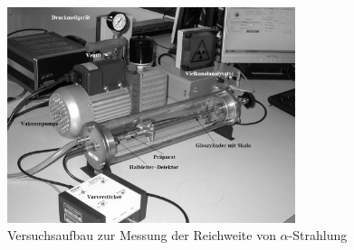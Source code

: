 \begin{figure}[h]
  \centering
  \label{fig:Versuchsaufbau}
  \includegraphics[width=0.75\textwidth]{Grafiken/V701_Versuchsaufbau_sw.jpg}
  \caption{Versuchsaufbau zur Messung der Reichweite von $\alpha$-Strahlung}
\end{figure}
